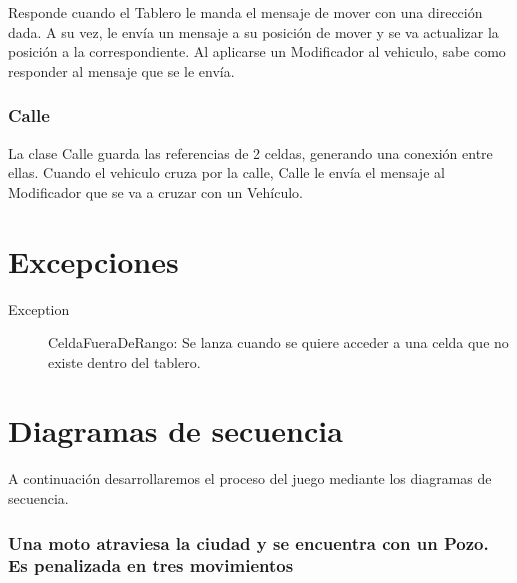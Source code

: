 \documentclass[titlepage,a4paper]{article}
\begin{document}
Responde cuando el Tablero le manda el mensaje de mover con una dirección dada. A su vez, le envía un mensaje a su posición de mover y se va actualizar la posición a la correspondiente. Al aplicarse un Modificador al vehiculo, sabe como responder al mensaje que se le envía.


\subsubsection[Calle]{Calle}

La clase Calle guarda las referencias de 2 celdas, generando una conexión entre ellas. Cuando el vehiculo cruza por la calle, Calle le envía el mensaje al Modificador que se va a cruzar con un Vehículo.


\section{Excepciones}\label{sec:excepciones}

\begin{description}
\item[Exception] CeldaFueraDeRango: Se lanza cuando se quiere acceder a una celda que no existe dentro del tablero.
\end{description}

\section{Diagramas de secuencia}\label{sec:diagramasdesecuencia}

A continuación desarrollaremos el proceso del juego mediante los diagramas de secuencia.


\subsubsection[Una moto atraviesa la ciudad y se encuentra con un Pozo. Es penalizada en tres movimientos]{Una moto atraviesa la ciudad y se encuentra con un Pozo. Es penalizada en tres movimientos}
\end{document}

